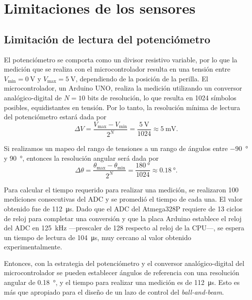 \section{Limitaciones de los sensores}

\subsection{Limitación de lectura del potenciómetro}

El potenciómetro se comporta como un divisor resistivo variable, por lo que la medición que se realiza con el microcontrolador resulta en una tensión entre $V_{\min} = \qty{0}{\V}$ y $V_{\max} = \qty{5}{\V}$, dependiendo de la posición de la perilla. El microcontrolador, un Arduino UNO, realiza la medición utilizando un conversor analógico-digital de $N = 10$ bits de resolución, lo que resulta en 1024 símbolos posibles, equidistantes en tensión. Por lo tanto, la resolución mínima de lectura del potenciómetro estará dada por
\begin{equation*}
    \Delta V = \frac{V_{\max} - V_{\min}}{2^N} = \frac{\qty{5}{\V}}{1024} \approx \qty{5}{\mV}.
\end{equation*}

Si realizamos un mapeo del rango de tensiones a un rango de ángulos entre \qty{-90}{\degree} y \qty{90}{\degree}, entonces la resolución angular será dada por
\begin{equation*}
    \Delta \theta = \frac{\theta_{\max} - \theta_{\min}}{2^N} = \frac{\qty{180}{\degree}}{1024} \approx \qty{0.18}{\degree}.
\end{equation*}

Para calcular el tiempo requerido para realizar una medición, se realizaron 100 mediciones consecutivas del ADC y se promedió el tiempo de cada una. El valor obtenido fue de \qty{112}{\us}. Dado que el ADC del Atmega328P requiere de 13 ciclos de reloj para completar una conversión y que la placa Arduino establece el reloj del ADC en \qty{125}{\kHz} ---prescaler de 128 respecto al reloj de la CPU---, se espera un tiempo de lectura de \qty{104}{\us}, muy cercano al valor obtenido experimentalmente.

Entonces, con la estrategia del potenciómetro y el conversor analógico-digital del microcontrolador se pueden establecer ángulos de referencia con una resolución angular de \qty{0.18}{\degree}, y el tiempo para realizar una medición es de \qty{112}{\us}. Esto es más que apropiado para el diseño de un lazo de control del \emph{ball-and-beam}.

